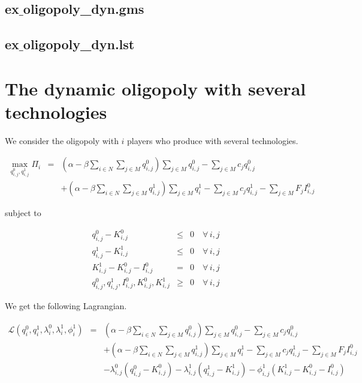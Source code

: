 \documentclass[11pt,a4paper]{article}
\begin{document}
\subsection*{ex$\_$oligopoly\_dyn.gms}



\subsection*{ex$\_$oligopoly\_dyn.lst}




\section{The dynamic oligopoly with several technologies}


We consider the oligopoly with $i$ players who produce with several technologies.

\begin{eqnarray*}
	\max_{q_{i,j}^0,q_{i,j}^1}\Pi_i &=& (\alpha-\beta \sum_{i\in N}\sum_{j\in M}q_{i,j}^0)\sum_{j\in M}q_{i,j}^0 - \sum_{j\in M}c_jq_{i,j}^0 \\
&& +  (\alpha-\beta \sum_{i\in N}\sum_{j\in M}q_{i,j}^1)\sum_{j\in M}q_i^1 - \sum_{j\in M}c_jq_{i,j}^1 - \sum_{j\in M}F_jI_{i,j}^0
\end{eqnarray*}

subject to

\begin{eqnarray*}
	q_{i,j}^0 - K_{i,j}^0 &\leq& 0 \quad\forall\, i,j\\
	q_{i,j}^1 - K_{i,j}^1 &\leq& 0 \quad\forall\, i,j\\
        K_{i,j}^1 - K_{i,j}^0 - I_{i,j}^0 &=& 0 \quad\forall\, i,j\\
	q_{i,j}^0,q_{i,j}^1,I_{i,j}^0, K_{i,j}^0, K_{i,j}^1 &\geq& 0 \quad\forall\, i,j
\end{eqnarray*}
 
We get the following Lagrangian.

\begin{eqnarray*}
	\mathcal{L}(q_i^0,q_i^1,\lambda_i^0,\lambda_i^1,\phi_i^1)&=&  (\alpha-\beta \sum_{i\in N}\sum_{j\in M}q_{i,j}^0)\sum_{j\in M}q_{i,j}^0 - \sum_{j\in M}c_jq_{i,j}^0 \\
&& +  (\alpha-\beta \sum_{i\in N}\sum_{j\in M}q_{i,j}^1)\sum_{j\in M}q_i^1 - \sum_{j\in M}c_jq_{i,j}^1 - \sum_{j\in M}F_jI_{i,j}^0\\
        && - \lambda_{i,j}^0(q_{i,j}^0-K_{i,j}^0) - \lambda_{i,j}^1(q_{i,j}^1-K_{i,j}^1) - \phi_{i,j}^1(K_{i,j}^1-K_{i,j}^0-I_{i,j}^0)
\end{eqnarray*}
\end{document}
